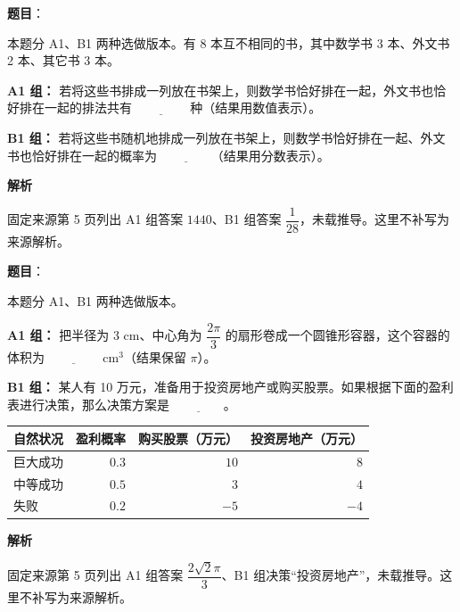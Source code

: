 \begin{answer}

\textbf{题目}：

本题分 A1、B1 两种选做版本。有 8 本互不相同的书，其中数学书 3 本、外文书 2 本、其它书 3 本。

\textbf{A1 组：} 若将这些书排成一列放在书架上，则数学书恰好排在一起，外文书也恰好排在一起的排法共有 $\underline{\qquad\qquad}$ 种（结果用数值表示）。

\textbf{B1 组：} 若将这些书随机地排成一列放在书架上，则数学书恰好排在一起、外文书也恰好排在一起的概率为 $\underline{\qquad\qquad}$（结果用分数表示）。

\textbf{解析}

固定来源第 5 页列出 A1 组答案 $1440$、B1 组答案 $\dfrac1{28}$，未载推导。这里不补写为来源解析。


\end{answer}
\begin{answer}

\textbf{题目}：

本题分 A1、B1 两种选做版本。

\textbf{A1 组：} 把半径为 $3\text{ cm}$、中心角为 $\dfrac{2\pi}{3}$ 的扇形卷成一个圆锥形容器，这个容器的体积为 $\underline{\qquad\qquad}\text{ cm}^3$（结果保留 $\pi$）。

\textbf{B1 组：} 某人有 10 万元，准备用于投资房地产或购买股票。如果根据下面的盈利表进行决策，那么决策方案是 $\underline{\qquad\qquad}$。

\begin{center}
\begin{tabular}{lrrr}
\toprule
自然状况 & 盈利概率 & 购买股票（万元） & 投资房地产（万元） \\
\midrule
巨大成功 & $0.3$ & $10$ & $8$ \\
中等成功 & $0.5$ & $3$ & $4$ \\
失败 & $0.2$ & $-5$ & $-4$ \\
\bottomrule
\end{tabular}
\end{center}

\textbf{解析}

固定来源第 5 页列出 A1 组答案 $\dfrac{2\sqrt2\pi}{3}$、B1 组决策“投资房地产”，未载推导。这里不补写为来源解析。


\end{answer}
